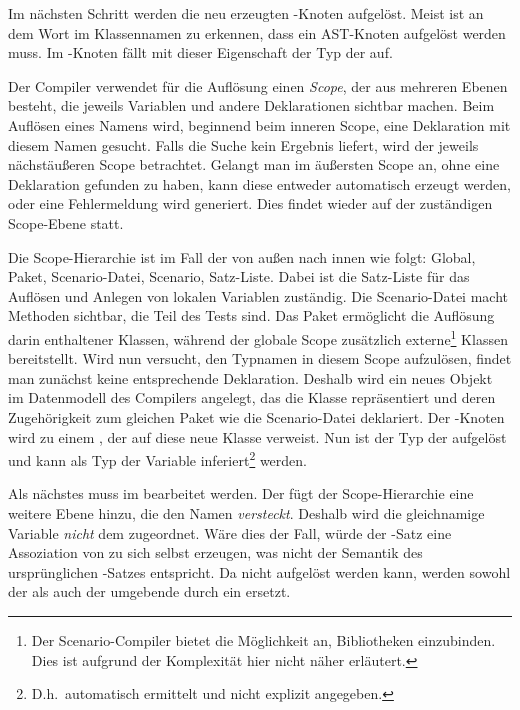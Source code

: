 

Im nächsten Schritt werden die neu erzeugten -Knoten aufgelöst.
Meist ist an dem Wort  im Klassennamen zu erkennen, dass ein AST-Knoten aufgelöst werden muss.
Im -Knoten fällt mit dieser Eigenschaft der Typ der  auf.

Der Compiler verwendet für die Auflösung einen \emph{Scope}, der aus mehreren Ebenen besteht, die jeweils Variablen und andere Deklarationen sichtbar machen.
Beim Auflösen eines Namens wird, beginnend beim inneren Scope, eine Deklaration mit diesem Namen gesucht.
Falls die Suche kein Ergebnis liefert, wird der jeweils nächstäußeren Scope betrachtet.
Gelangt man im äußersten Scope an, ohne eine Deklaration gefunden zu haben, kann diese entweder automatisch erzeugt werden, oder eine Fehlermeldung wird generiert.
Dies findet wieder auf der zuständigen Scope-Ebene statt.

Die Scope-Hierarchie ist im Fall der  von außen nach innen wie folgt:
Global, Paket, Scenario-Datei, Scenario, Satz-Liste.
Dabei ist die Satz-Liste für das Auflösen und Anlegen von lokalen Variablen zuständig.
Die Scenario-Datei macht Methoden sichtbar, die Teil des Tests sind.
Das Paket ermöglicht die Auflösung darin enthaltener Klassen, während der globale Scope zusätzlich externe\footnote{Der Scenario-Compiler bietet die Möglichkeit an, Bibliotheken einzubinden.
Dies ist aufgrund der Komplexität hier nicht näher erläutert.} Klassen bereitstellt.
Wird nun versucht, den Typnamen  in diesem Scope aufzulösen, findet man zunächst keine entsprechende Deklaration.
Deshalb wird ein neues Objekt im Datenmodell des Compilers angelegt, das die Klasse  repräsentiert und deren Zugehörigkeit zum gleichen Paket wie die Scenario-Datei deklariert.
Der -Knoten wird zu einem , der auf diese neue Klasse verweist.
Nun ist der Typ der  aufgelöst und kann als Typ der Variable  inferiert\footnote{D.h.\ automatisch ermittelt und nicht explizit angegeben.} werden.

Als nächstes muss  im  bearbeitet werden.
Der  fügt der Scope-Hierarchie eine weitere Ebene hinzu, die den Namen  \emph{versteckt}.
Deshalb wird die gleichnamige Variable \emph{nicht} dem  zugeordnet.
Wäre dies der Fall, würde der -Satz eine Assoziation von  zu sich selbst erzeugen, was nicht der Semantik des ursprünglichen -Satzes entspricht.
Da  nicht aufgelöst werden kann, werden sowohl der  als auch der umgebende  durch ein  ersetzt.

